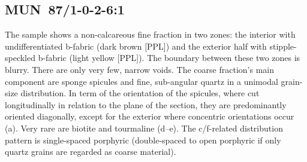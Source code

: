 \documentclass[a4paper]{article}
\begin{document}
\newpage\subsection{MUN~87/1-0-2-6:1 \citep[mun\#17; Fig.~\ref{fig:mun.pottery}.14; Ebambe style;][471 Pl.~90.2]{Seidensticker.2021e}}

\begin{multicols}{2}
\noindent The sample shows a non-calcareous fine fraction in two zones: the interior with undifferentiated b-fabric (dark brown [PPL]) and the exterior half with stipple-speckled b-fabric (light yellow [PPL]). The boundary between these two zones is blurry. There are only very few, narrow voids. The coarse fraction's main component are sponge spicules and fine, sub-angular quartz in a unimodal grain-size distribution. In term of the orientation of the spicules, where cut longitudinally in relation to the plane of the section, they are predominantly oriented diagonally, except for the exterior where concentric orientations occur (a). Very rare are biotite and tourmaline (d--e). The c/f-related distribution pattern is single-spaced porphyric (double-spaced to open porphyric if only quartz grains are regarded as coarse material).
\end{multicols}
\end{document}
